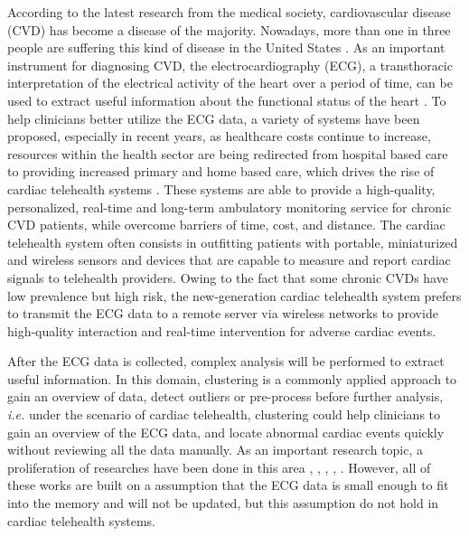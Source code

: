 \documentclass[conference]{IEEEtran}
\begin{document}
According to the latest research from the medical society, cardiovascular disease (CVD) has become a disease of the majority. Nowadays, more than one in three people are suffering this kind of disease in the United States \cite{Roger15122011}. As an important instrument for diagnosing CVD, the electrocardiography (ECG), a transthoracic interpretation of the electrical activity of the heart over a period of time, can be used to extract useful information about the functional status of the heart \cite{springerlink:10.1007/978-3-642-15020-3_21}. To help clinicians better utilize the ECG data, a variety of systems have been proposed, especially in recent years, as healthcare costs continue to increase, resources within the health sector are being redirected from hospital based care to providing increased primary and home based care, which drives the rise of cardiac telehealth systems \cite{demiris2010role}. These systems are able to provide a high-quality, personalized, real-time and long-term ambulatory monitoring service for chronic CVD patients, while overcome barriers of time, cost, and distance. The cardiac telehealth system often consists in outfitting patients with portable, miniaturized and wireless sensors and devices that are capable to measure and report cardiac signals to telehealth providers. Owing to the fact that some chronic CVDs have low prevalence but high risk, the new-generation cardiac telehealth system prefers to transmit the ECG data to a remote server via wireless networks to provide high-quality interaction and real-time intervention for adverse cardiac events. 


After the ECG data is collected, complex analysis will be performed to extract useful information. In this domain, clustering is a commonly applied approach to gain an overview of data, detect outliers or pre-process before further analysis, \textit{i.e.} under the scenario of cardiac telehealth, clustering could help clinicians to gain an overview of the ECG data, and locate abnormal cardiac events quickly without reviewing all the data manually. As an important research topic, a proliferation of researches have been done in this area \cite{lagerholm2000clustering}, \cite{sufi2011clustering}, \cite{ceylan2009novel}, \cite{bortolan1991ecg}, \cite{bortolan1993diagnostic}. However, all of these works are built on a assumption that the ECG data is small enough to fit into the memory and will not be updated, but this assumption do not hold in cardiac telehealth systems.
\end{document}
